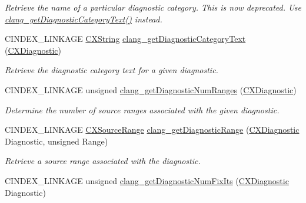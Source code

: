 \begin{DoxyCompactItemize}
\begin{DoxyCompactList}\small\item\em Retrieve the name of a particular diagnostic category. This is now deprecated. Use \mbox{\hyperlink{group__CINDEX__DIAG_ga6950702b6122f1cd74e1a369605a9f54}{clang\+\_\+get\+Diagnostic\+Category\+Text()}} instead. \end{DoxyCompactList}\item 
C\+I\+N\+D\+E\+X\+\_\+\+L\+I\+N\+K\+A\+GE \mbox{\hyperlink{structCXString}{C\+X\+String}} \mbox{\hyperlink{group__CINDEX__DIAG_ga6950702b6122f1cd74e1a369605a9f54}{clang\+\_\+get\+Diagnostic\+Category\+Text}} (\mbox{\hyperlink{group__CINDEX__DIAG_ga44bb8aba7c40590ad25d1763c4fbff7f}{C\+X\+Diagnostic}})
\begin{DoxyCompactList}\small\item\em Retrieve the diagnostic category text for a given diagnostic. \end{DoxyCompactList}\item 
\mbox{\label{group__CINDEX__DIAG_ga7acbd761f1113ea657022e5708694924}} 
C\+I\+N\+D\+E\+X\+\_\+\+L\+I\+N\+K\+A\+GE unsigned \mbox{\hyperlink{group__CINDEX__DIAG_ga7acbd761f1113ea657022e5708694924}{clang\+\_\+get\+Diagnostic\+Num\+Ranges}} (\mbox{\hyperlink{group__CINDEX__DIAG_ga44bb8aba7c40590ad25d1763c4fbff7f}{C\+X\+Diagnostic}})
\begin{DoxyCompactList}\small\item\em Determine the number of source ranges associated with the given diagnostic. \end{DoxyCompactList}\item 
C\+I\+N\+D\+E\+X\+\_\+\+L\+I\+N\+K\+A\+GE \mbox{\hyperlink{structCXSourceRange}{C\+X\+Source\+Range}} \mbox{\hyperlink{group__CINDEX__DIAG_gabd440f1577374289ffebe73d9f65b294}{clang\+\_\+get\+Diagnostic\+Range}} (\mbox{\hyperlink{group__CINDEX__DIAG_ga44bb8aba7c40590ad25d1763c4fbff7f}{C\+X\+Diagnostic}} Diagnostic, unsigned Range)
\begin{DoxyCompactList}\small\item\em Retrieve a source range associated with the diagnostic. \end{DoxyCompactList}\item 
\mbox{\label{group__CINDEX__DIAG_gafe38dfd661f6ba59df956dfeabece2a2}} 
C\+I\+N\+D\+E\+X\+\_\+\+L\+I\+N\+K\+A\+GE unsigned \mbox{\hyperlink{group__CINDEX__DIAG_gafe38dfd661f6ba59df956dfeabece2a2}{clang\+\_\+get\+Diagnostic\+Num\+Fix\+Its}} (\mbox{\hyperlink{group__CINDEX__DIAG_ga44bb8aba7c40590ad25d1763c4fbff7f}{C\+X\+Diagnostic}} Diagnostic)

\end{DoxyCompactItemize}
